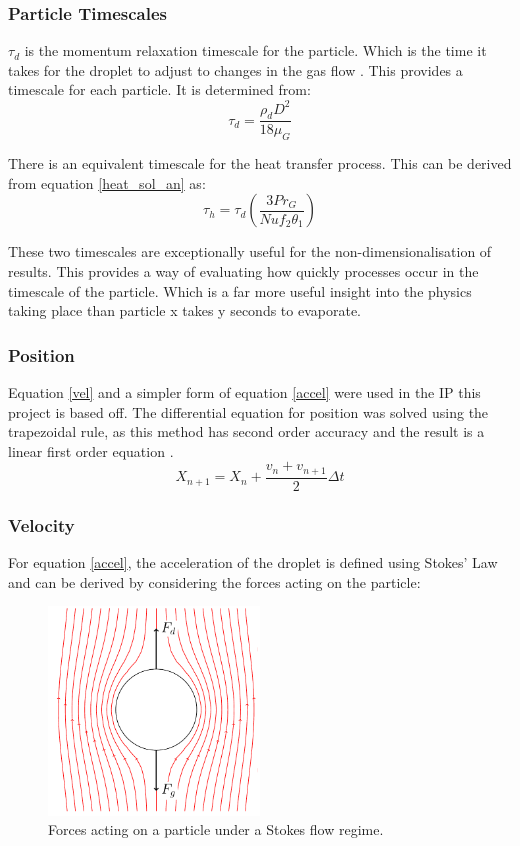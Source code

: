 \documentclass[../Interim_Report_Master]{subfiles}
\begin{document}
\subsubsection{Particle Timescales}
$\tau_d$ is the momentum relaxation timescale for the particle. Which is the time it takes for the droplet to adjust to changes in the gas flow \cite{holterman2012}. This provides a timescale for each particle. It is determined from:
\begin{equation}
\tau_d = \frac{\rho_d D^2}{18\mu_G}
\end{equation}

There is an equivalent timescale for the heat transfer process. This can be derived from equation \ref{heat_sol_an} as:
\begin{equation}
\tau_h = \tau_d\left(\frac{3Pr_G}{Nu f_2 \theta_1}\right)
\end{equation}

These two timescales are exceptionally useful for the non-dimensionalisation of results. This provides a way of evaluating how quickly processes occur in the timescale of the particle. Which is a far more useful insight into the physics taking place than particle x takes y seconds to evaporate.

\subsubsection{Position}
Equation \ref{vel} and a simpler form of equation \ref{accel} were used in the IP this project is based off. The differential equation for position was solved using the trapezoidal rule, as this method has second order accuracy and the result is a linear first order equation \cite{Elijah_GPU_Report}. 
\begin{equation}
X_{n+1} = X_{n} + \frac{v_{n}+v_{n+1}}{2} \Delta t
\end{equation}

\subsubsection{Velocity}\label{sec:vel}
For equation \ref{accel}, the acceleration of the droplet is defined using Stokes' Law and can be derived by considering the forces acting on the particle:
\begin{figure}
	\centering
	\includegraphics[width=0.5\textwidth, trim=12 0 6 0, clip]{./Diagrams/Particle_Forces/Particle_Forces.pdf}
	\caption{Forces acting on a particle under a Stokes flow regime.}
	\label{particle_forces}
\end{figure}
\end{document}
